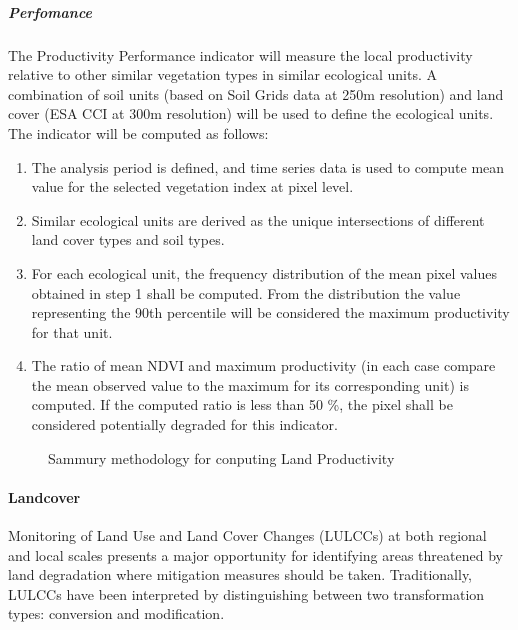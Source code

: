 \documentclass[letterpaper,10pt,english]{sphinxmanual}
\let\sphinxpxdimen\pdfpxdimen\else\newdimen\sphinxpxdimen
\begin{document}
\subparagraph{Perfomance}
\label{\detokenize{Background/LD_indicators:perfomance}}
\sphinxAtStartPar
The Productivity Performance indicator will measure the local productivity relative to other similar vegetation types in similar ecological units. A combination of soil units (based on Soil Grids data at 250m resolution) and land cover (ESA CCI at 300m resolution) will be used to define the ecological units. The indicator will be computed as follows:
\begin{enumerate}
%
\item {} 
\sphinxAtStartPar
The analysis period is defined, and time series data is used to compute mean value for the selected vegetation index at pixel level.

\item {} 
\sphinxAtStartPar
Similar ecological units are derived as the unique intersections of different land cover types and soil types.

\item {} 
\sphinxAtStartPar
For each ecological unit, the frequency distribution of the mean pixel values obtained in step 1 shall be computed. From the distribution the value representing the 90th percentile will be considered the maximum productivity for that unit.

\item {} 
\sphinxAtStartPar
The ratio of mean NDVI and maximum productivity (in each case compare the mean observed value to the maximum for its corresponding unit) is computed. If the computed ratio is less than 50 \%, the pixel shall be considered potentially degraded for this indicator.

\end{enumerate}

\begin{figure}[H]
\centering
\capstart

\noindent\sphinxincludegraphics[width=700\sphinxpxdimen,height=500\sphinxpxdimen]{{sdgmethodology}.png}
\caption{Sammury methodology for conputing Land Productivity}\label{\detokenize{Background/LD_indicators:id4}}\end{figure}


\paragraph{Landcover}
\label{\detokenize{Background/LD_indicators:landcover}}
\sphinxAtStartPar
Monitoring of Land Use and Land Cover Changes (LULCCs) at both regional and local scales presents a major opportunity for identifying areas threatened by land degradation where mitigation measures should be taken. Traditionally, LULCCs have been interpreted by distinguishing between two transformation types: conversion and modification.
\end{document}

